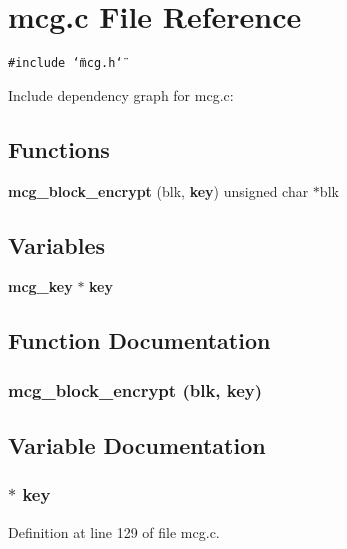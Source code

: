 \section{mcg.c File Reference}
\label{mcg_8c}


{\tt \#include \char`\"{}mcg.h\char`\"{}}\par


Include dependency graph for mcg.c:\subsection*{Functions}
\begin{CompactItemize}
\item 
{\bf mcg\_\-block\_\-encrypt} (blk, {\bf key}) unsigned char $\ast$blk
\end{CompactItemize}
\subsection*{Variables}
\begin{CompactItemize}
\item 
{\bf mcg\_\-key} $\ast$ {\bf key}
\end{CompactItemize}


\subsection{Function Documentation}
\subsubsection{\setlength{\rightskip}{0pt plus 5cm}mcg\_\-block\_\-encrypt (blk, {\bf key})}\label{mcg_8c_a1}




\subsection{Variable Documentation}
\subsubsection{$\ast$ {\bf key}}\label{mcg_8c_a0}




Definition at line 129 of file mcg.c.